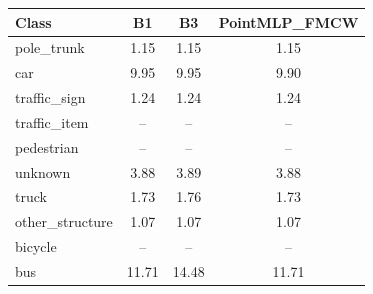 \begin{tabular}{lccc}
\toprule
Class & B1 & B3 & PointMLP\_FMCW \\
\midrule
pole\_trunk & 1.15 & 1.15 & 1.15 \\
car & 9.95 & 9.95 & 9.90 \\
traffic\_sign & 1.24 & 1.24 & 1.24 \\
traffic\_item & -- & -- & -- \\
pedestrian & -- & -- & -- \\
unknown & 3.88 & 3.89 & 3.88 \\
truck & 1.73 & 1.76 & 1.73 \\
other\_structure & 1.07 & 1.07 & 1.07 \\
bicycle & -- & -- & -- \\
bus & 11.71 & 14.48 & 11.71 \\
\bottomrule
\end{tabular}
